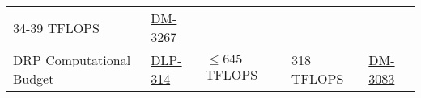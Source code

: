 \begin{longtable}[]{@{}lllll@{}}
\begin{minipage}[t]{0.14\columnwidth}
34-39 TFLOPS\strut
\end{minipage} & \begin{minipage}[t]{0.17\columnwidth}\raggedright\strut
\href{https://jira.lsstcorp.org/browse/DM-3267}{DM-3267}\strut
\end{minipage}\tabularnewline
\begin{minipage}[t]{0.22\columnwidth}\raggedright\strut
DRP Computational Budget\strut
\end{minipage} & \begin{minipage}[t]{0.11\columnwidth}\raggedright\strut
\href{https://jira.lsstcorp.org/browse/DLP-314}{DLP-314}\strut
\end{minipage} & \begin{minipage}[t]{0.21\columnwidth}\raggedright\strut
\(\leq 645\) TFLOPS\strut
\end{minipage} & \begin{minipage}[t]{0.14\columnwidth}\raggedright\strut
318 TFLOPS\strut
\end{minipage} & \begin{minipage}[t]{0.17\columnwidth}\raggedright\strut
\href{https://jira.lsstcorp.org/browse/DM-3083}{DM-3083}\strut
\end{minipage}\tabularnewline
\bottomrule
\end{longtable}
